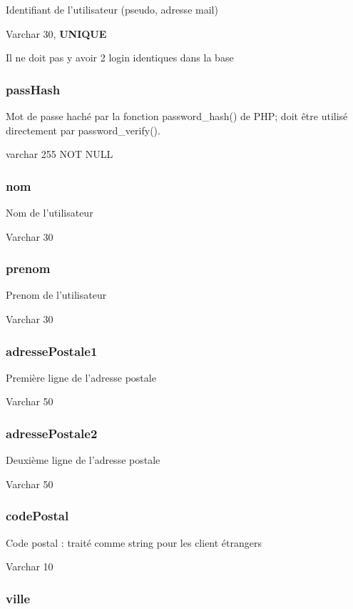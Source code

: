 Identifiant de l'utilisateur (pseudo, adresse mail)

Varchar 30, \textbf{UNIQUE}

Il ne doit pas y avoir 2 login identiques dans la base

\subsubsection{passHash}\label{passhash}

Mot de passe haché par la fonction password\_hash() de PHP; doit être
utilisé directement par password\_verify().

varchar 255 NOT NULL

\subsubsection{nom}\label{nom}

Nom de l'utilisateur

Varchar 30

\subsubsection{prenom}\label{prenom}

Prenom de l'utilisateur

Varchar 30

\subsubsection{adressePostale1}\label{adressepostale1}

Première ligne de l'adresse postale

Varchar 50

\subsubsection{adressePostale2}\label{adressepostale2}

Deuxième ligne de l'adresse postale

Varchar 50

\subsubsection{codePostal}\label{codepostal}

Code postal : traité comme string pour les client étrangers

Varchar 10

\subsubsection{ville}\label{ville}

